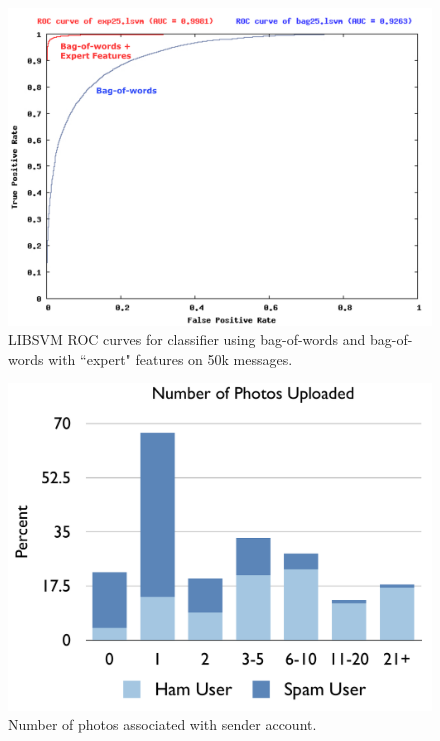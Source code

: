 \documentclass[preprint]{acm_proc_article-sp}
\begin{document}
\begin{figure}[h]
    \centering
    \includegraphics[width=\linewidth]{figures/roc-25.pdf}
    \caption{LIBSVM ROC curves for classifier using bag-of-words and bag-of-words with ``expert" features on 50k messages.}
    \label{fig:roc-25}
\end{figure}


\begin{figure}[h]
    \centering
    \includegraphics[width=\linewidth]{figures/photos.pdf}
    \caption{Number of photos associated with sender account.}
    \label{fig:photos}
\end{figure}
\end{document}
